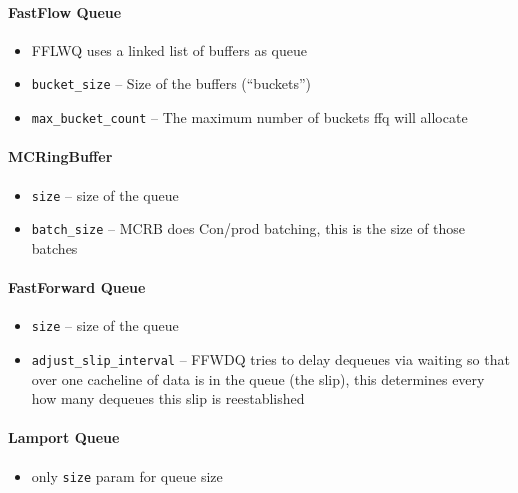 \paragraph{FastFlow Queue}
\begin{itemize}
    \item FFLWQ uses a linked list of buffers as queue
    \item \texttt{bucket\_size} -- Size of the buffers (``buckets'')
    \item \texttt{max\_bucket\_count} -- The maximum number of buckets ffq will allocate
\end{itemize}

\paragraph{MCRingBuffer}
\begin{itemize}
    \item \texttt{size} -- size of the queue
    \item \texttt{batch\_size} -- MCRB does Con/prod batching, this is the size of those batches
\end{itemize}

\paragraph{FastForward Queue}
\begin{itemize}
    \item \texttt{size} -- size of the queue
    \item \texttt{adjust\_slip\_interval} -- FFWDQ tries to delay dequeues via waiting so that over one
        cacheline of data is in the queue (the slip), this determines every how many dequeues this slip is
        reestablished
\end{itemize}

\paragraph{Lamport Queue}
\begin{itemize}
    \item only \texttt{size} param for queue size
\end{itemize}

